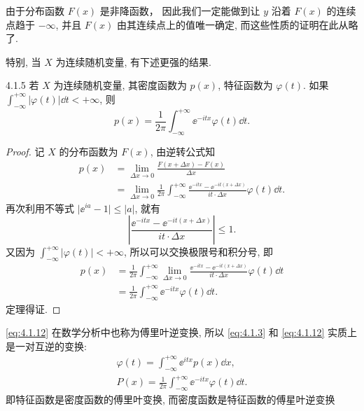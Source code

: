 由于分布函数 $ F (x) $ 是非降函数， 因此我们一定能做到让 $ y $ 沿着 $ F (x) $ 的连续点趋于 $ -\infty $, 并且 $ F (x) $ 由其连续点上的值唯一确定, 而这些性质的证明在此从略了.

特别, 当 $ X $ 为连续随机变量, 有下述更强的结果.
\begin{theorem}{}{4.1.5}
    若 $ X $ 为连续随机变量, 其密度函数为 $ p (x) $, 特征函数为 $ \varphi (t) $.
    如果 $ \int_{-\infty}^{+\infty} \lvert \varphi (t) \rvert \dd t < +\infty $, 则
    \begin{equation}\label{eq:4.1.12}
        p (x) = \frac{1}{2\pi} \int_{-\infty}^{+\infty} \ee^{-itx} \varphi (t) \dd t.
    \end{equation}
\end{theorem}

\begin{proof}
    记 $ X $ 的分布函数为 $ F (x) $, 由逆转公式知
    \begin{align*}
        p (x) & = \lim_{\Delta x \to 0} \frac{F (x + \Delta x) - F (x)}{\Delta x}\\
        & = \lim_{\Delta x \to 0} \frac{1}{2\pi} \int_{-\infty}^{+\infty} \frac{\ee^{-itx} - \ee^{-it (x + \Delta x)}}{it \cdot \Delta x} \varphi (t) \dd t.
    \end{align*}
    再次利用不等式 $ \lvert \ee^{ia} - 1 \rvert \leq \lvert a \rvert $, 就有
    \begin{equation*}
        \left\lvert \frac{\ee^{-itx} - \ee^{-it (x + \Delta x)}}{it \cdot \Delta x} \right\rvert \leq 1.
    \end{equation*}
    又因为 $ \int_{-\infty}^{+\infty} \lvert \varphi (t) \rvert < +\infty $, 所以可以交换极限号和积分号, 即
    \begin{align*}
        p (x) & = \frac{1}{2\pi} \int_{-\infty}^{+\infty} \lim_{\Delta x \to 0} \frac{\ee^{-itx} - \ee^{-it (x + \Delta x)}}{it \cdot \Delta x} \varphi (t) \dd t\\
        & = \frac{1}{2\pi} \int_{-\infty}^{+\infty} \ee^{-itx} \varphi (t) \dd t.
    \end{align*}
    定理得证.
\end{proof}

\eqref{eq:4.1.12} 在数学分析中也称为傅里叶逆变换, 所以 \eqref{eq:4.1.3} 和 \eqref{eq:4.1.12} 实质上是一对互逆的变换:
\begin{gather*}
    \varphi (t) = \int_{-\infty}^{+\infty} \ee^{itx} p (x) \dd x,\\
    P (x) = \frac{1}{2\pi} \int_{-\infty}^{+\infty} \ee^{-itx} \varphi (t) \dd t.
\end{gather*}
即特征函数是密度函数的傅里叶变换, 而密度函数是特征函数的傅星叶逆变换

